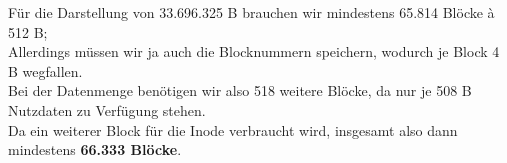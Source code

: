 
Für die Darstellung von 33.696.325 B brauchen wir mindestens 65.814 Blöcke à 512 B; \\\newline
Allerdings müssen wir ja auch die Blocknummern speichern, wodurch je Block 4 B wegfallen. \\\newline
Bei der Datenmenge benötigen wir also 518 weitere Blöcke, da nur je 508 B Nutzdaten zu Verfügung stehen. \\\newline
Da ein weiterer Block für die Inode verbraucht wird, insgesamt also dann mindestens \textbf{66.333 Blöcke}.\\ \newline
\newline
%
%
